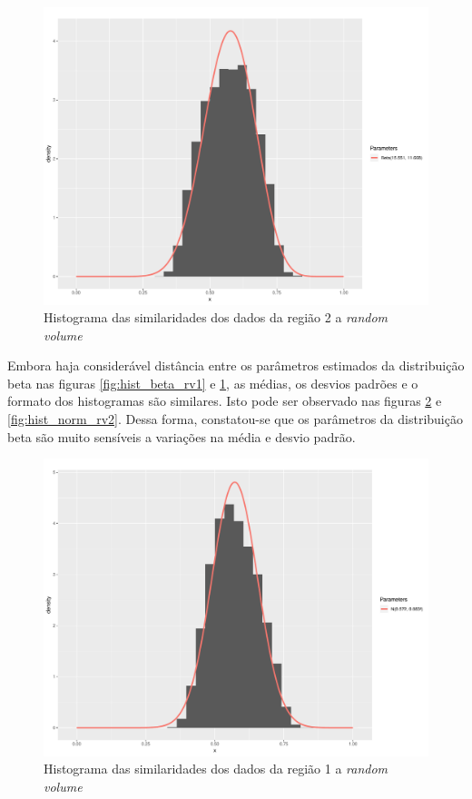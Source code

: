 \documentclass[12pt]{article}
\begin{document}
\begin{figure}[!h]

  \centering
  \includegraphics[width=0.8\linewidth]{../../Figures/Report_19_02_27/hist_rv_beta_region2.pdf}
  \caption{Histograma das similaridades dos dados da região 2 a \textit{random volume}}
  \label{fig:hist_beta_rv2}

\end{figure}

Embora haja considerável distância entre os parâmetros estimados da distribuição beta nas figuras \ref{fig:hist_beta_rv1} e \ref{fig:hist_beta_rv2}, as médias, os desvios padrões e o formato dos histogramas são similares. Isto pode ser observado nas figuras \ref{fig:hist_norm_rv1} e \ref{fig:hist_norm_rv2}. Dessa forma, constatou-se que os parâmetros da distribuição beta são muito sensíveis a variações na média e desvio padrão.

\begin{figure}[!h]

  \centering
  \includegraphics[width=0.8\linewidth]{../../Figures/Report_19_02_27/hist_rv_norm_region1.pdf}
  \caption{Histograma das similaridades dos dados da região 1 a \textit{random volume}}
  \label{fig:hist_norm_rv1}

\end{figure}
\end{document}
